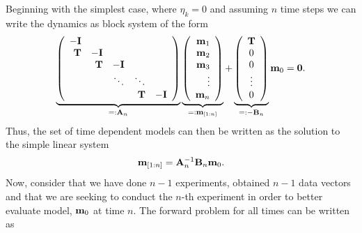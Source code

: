 \documentclass[12pt]{article}
\newcommand{\bfA}	{{\bf{A}}}
\newcommand{\bfB}	{{\bf{B}}}
\newcommand{\bfI}	{{\bf{I}}}
\newcommand{\bfT}	{{\bf{T}}}
\newcommand{\bfm}	{{\bf{m}}}
\newcommand {\zero}   	 { {\bf 0} }
\begin{document}
Beginning with the simplest case, where $\eta_k = 0$ and assuming $n$ time steps
 we can write the dynamics as block system
of the form
\begin{equation}\label{eq:FlowSystem}
	 \underbrace{
		\left( 
			\begin{array}{rrrrr}
				- \bfI      &           &         &        &        \\
				  \bfT & -\bfI      &         &        &        \\
				           &  \bfT & -\bfI    &        &        \\
				           &           &  \ddots & \ddots &        \\
				           &           &         & \bfT    & -\bfI   \\
			\end{array}
		\right)
	 }_{=: \bfA_{n}}
	 \underbrace{
		\left(
			\begin{array}{r}
				\bfm_1 \\ \bfm_2 \\ \bfm_3 \\ \vdots \\ \bfm_n
			\end{array}
		\right)
	 }_{=: \bfm_{[1:n]}}
	+
	 \underbrace{
		\left(
			\begin{array}{c}
			\bfT \\ 0  \\ 0\\ \vdots \\ 0
			\end{array}
		\right)
	 }_{=: -\bfB_{n}}
	\bfm_0
	= 
	{\zero}.
\end{equation}
Thus, the set of time dependent models can then be written as the solution to the simple linear system
\begin{equation}
\bfm_{[1:n]} = \bfA_{n}^{-1} \bfB_{n} \bfm_0.
\end{equation}
Now, consider that we have done $n-1$ experiments, obtained $n-1$ data vectors 
and that we are seeking to conduct the $n$-th experiment in order
to better evaluate  model, $\bfm_{0}$ at time $n$. The forward problem for all times can be written as
\end{document}
